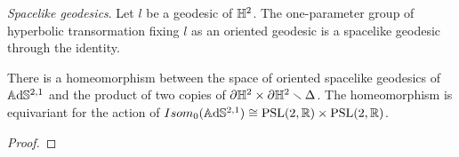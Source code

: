 \noindent\textit{Spacelike geodesics}.
Let $l$ be a geodesic of $\mathbb{H}^2$. The one-parameter group of hyperbolic transormation fixing $l$ as an oriented geodesic is a spacelike geodesic through the identity.
\begin{proposition}
    There is a homeomorphism between the space of oriented spacelike geodesics of $\mathbb{A}\mathrm{d}\mathbb{S}^{2,1}$ and the product of two copies of $\partial \mathbb{H}^2 \times \partial \mathbb{H}^2 \smallsetminus \Delta$. 
    The homeomorphism is equivariant for the action of $Isom_0(\mathbb{A}\mathrm{d}\mathbb{S}^{2,1}) \cong \text{PSL}(2,\mathbb{R}) \times \text{PSL}(2,\mathbb{R})$.
\end{proposition}
\begin{proof}
\end{proof}